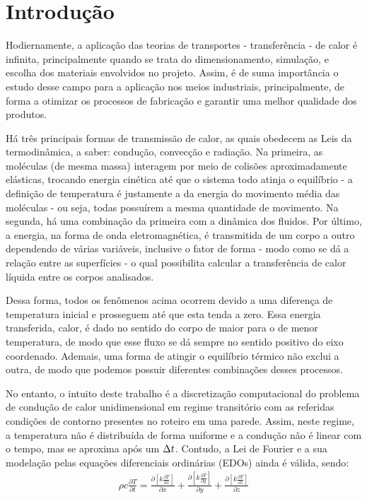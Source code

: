 \documentclass[journal]{IEEEtran}
\begin{document}
\section{Introdução}
    Hodiernamente, a aplicação das teorias de transportes - transferência - de calor é infinita, principalmente quando se trata do dimensionamento, simulação, e escolha dos materiais envolvidos no projeto. Assim, é de suma importância o estudo desse campo para a aplicação nos meios industriais, principalmente, de forma a otimizar os processos de fabricação e garantir uma melhor qualidade dos produtos.
    \par Há três principais formas de transmissão de calor, as quais obedecem as Leis da termodinâmica, a saber: condução, convecção e radiação. Na primeira, as moléculas (de mesma massa) interagem por meio de colisões aproximadamente elásticas, trocando energia cinética até que o sistema todo atinja o equilíbrio - a definição de temperatura é justamente a da energia do movimento média das moléculas - ou seja, todas possuírem a mesma quantidade de movimento. Na segunda, há uma combinação da primeira com a dinâmica dos fluidos. Por último, a energia, na forma de onda eletromagnética, é transmitida de um corpo a outro dependendo de várias variáveis, inclusive o fator de forma - modo como se dá a relação entre as superfícies - o qual possibilita calcular a transferência de calor líquida entre os corpos analisados.\cite{comsol}
	\par Dessa forma, todos os fenômenos acima ocorrem devido a uma diferença de temperatura inicial e prosseguem até que esta tenda a zero. Essa energia transferida, calor, é dado no sentido do corpo de maior para o de menor temperatura, de modo que esse fluxo se dá sempre no sentido positivo do eixo coordenado. Ademais, uma forma de atingir o equilíbrio térmico não exclui a outra, de modo que podemos possuir diferentes combinações desses processos.
    \par No entanto, o intuito deste trabalho é a discretização computacional do problema de condução de calor unidimensional em regime transitório com as referidas condições de contorno presentes no roteiro em uma parede. Assim, neste regime, a temperatura não é distribuída de forma uniforme e a condução não é linear com o tempo, mas se aproxima após um $\Delta t\\$. Contudo, a Lei de Fourier e a sua modelação pelas equações diferenciais ordinárias (EDOs) ainda é válida, sendo:
        \begin{align}
            \rho c\frac{\partial T}{\partial t} = \frac{\partial [k \frac{\partial T}{\partial x}]}{\partial x} + \frac{\partial [k \frac{\partial T}{\partial y}]}{\partial y} + \frac{\partial [k \frac{\partial T}{\partial z}]}{\partial z}
        \end{align}
\end{document}
